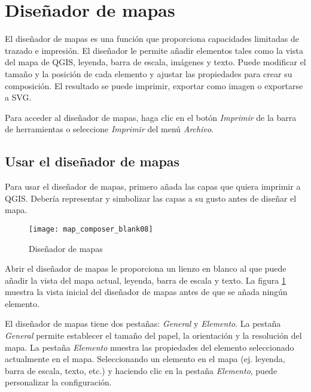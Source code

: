 
\section{Diseñador de mapas}\label{label_mapcomposer}

El diseñador de mapas es una función que proporciona capacidades limitadas de trazado e impresión. El diseñador le permite añadir elementos tales como la vista del mapa de QGIS, leyenda, barra de escala, imágenes y texto. Puede modificar el tamaño y la posición de cada elemento y ajustar las propiedades para crear su composición. El resultado se puede imprimir, exportar como imagen o exportarse a SVG.

Para acceder al diseñador de mapas, haga clic en el botón \textit{Imprimir} de la barra de herramientas o seleccione \textit{Imprimir} del menú \textit{Archivo}.

\subsection{Usar el diseñador de mapas}\label{label_usemapcomposer} 

Para usar el diseñador de mapas, primero añada las capas que quiera imprimir a QGIS. Debería representar y simbolizar las capas a su gusto antes de diseñar el mapa. 

\begin{figure}[ht]
   \begin{center}
   \caption{Diseñador de mapas}\label{fig:map_composer_blank}\smallskip
   \texttt{[image: map\_composer\_blank08]}
\end{center}  
\end{figure}

Abrir el diseñador de mapas le proporciona un lienzo en blanco al que puede añadir la vista del mapa actual, leyenda, barra de escala y texto. La figura
\ref{fig:map_composer_blank} muestra la vista inicial del diseñador de mapas antes de que se añada ningún elemento.

El diseñador de mapas tiene dos pestañas: \textit{General} y \textit{Elemento}. La pestaña
\textit{General} permite establecer el tamaño del papel, la orientación y la resolución del mapa. La pestaña \textit{Elemento} muestra las propiedades del elemento seleccionado actualmente en el mapa. Seleccionando un elemento en el mapa (ej. leyenda, barra de escala, texto, etc.) y haciendo clic en la pestaña \textit{Elemento}, puede personalizar la configuración.

